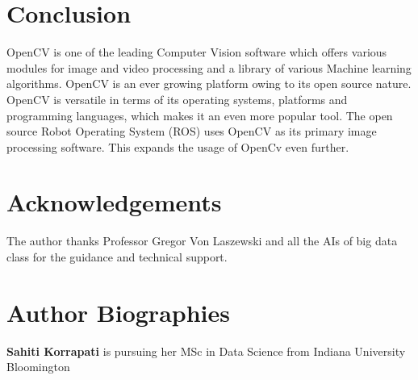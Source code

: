 \documentclass[9pt,twocolumn,twoside]{../../styles/osajnl}
\begin{document}
\section{Conclusion}
OpenCV is one of the leading Computer Vision software which offers various modules for image and video processing and a library of various Machine learning algorithms. OpenCV is an ever growing platform owing to its open source nature. OpenCV is versatile in terms of its operating systems, platforms and programming languages, which makes it an even more popular tool. The open source Robot Operating System (ROS) uses OpenCV as its primary image processing software. This expands the usage of OpenCv even further. 

\section*{Acknowledgements}

The author thanks Professor Gregor Von Laszewski and all the AIs of big data class for the guidance and technical support.



 
\section*{Author Biographies}
\begingroup
\setlength\intextsep{0pt}
\begin{minipage}[t][3.2cm][t]{1.0\columnwidth} %
  \noindent
  {\bfseries Sahiti Korrapati} is pursuing her MSc in Data Science from
  Indiana University Bloomington
\end{minipage}
\endgroup
\end{document}
